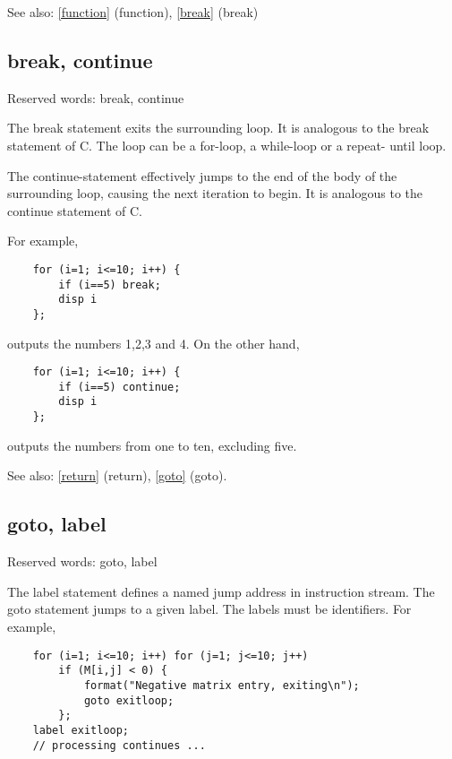 \documentclass[a4paper]{article}
\begin{document}
See also: \ref{function} {(function)}, \ref{break} {(break)}




\subsection{break, continue\label{break}}

Reserved words: break, continue

The break statement exits the surrounding loop.
It is analogous to the break statement of C.
The loop can be a for-loop, a while-loop or a repeat-
until loop.

The continue-statement effectively jumps to the end
of the body of the surrounding loop, causing the next
iteration to begin. It is analogous to the continue
statement of C.

For example,
\begin{tscreen}
\begin{verbatim}
    for (i=1; i<=10; i++) {
        if (i==5) break;
        disp i
    };
\end{verbatim}
\end{tscreen}

outputs the numbers 1,2,3 and 4.
On the other hand,
\begin{tscreen}
\begin{verbatim}
    for (i=1; i<=10; i++) {
        if (i==5) continue;
        disp i
    };
\end{verbatim}
\end{tscreen}

outputs the numbers from one to ten, excluding five.

See also: \ref{return} {(return)}, \ref{goto} {(goto)}.




\subsection{goto, label\label{goto}}

Reserved words: goto, label

The label statement defines a named jump address in instruction stream.
The goto statement jumps to a given label. The labels must be
identifiers. For example,

\begin{tscreen}
\begin{verbatim}
    for (i=1; i<=10; i++) for (j=1; j<=10; j++)
        if (M[i,j] < 0) {
            format("Negative matrix entry, exiting\n");
            goto exitloop;
        };
    label exitloop;
    // processing continues ...
\end{verbatim}
\end{tscreen}
\end{document}
